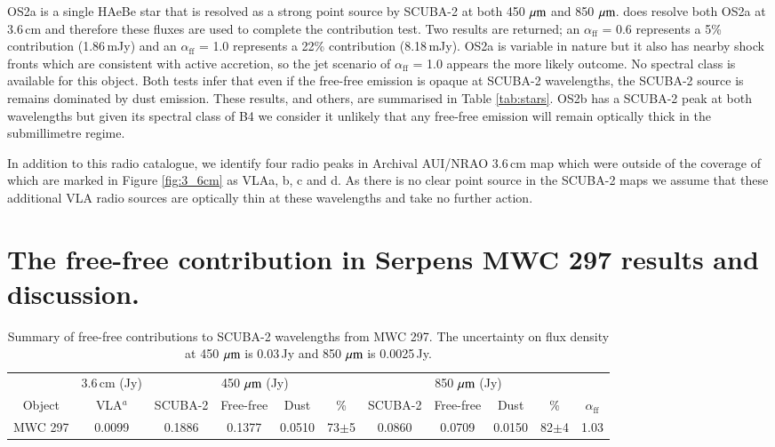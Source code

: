 OS2a is a single HAeBe star that is resolved as a strong point source by SCUBA-2 at both 450\,$\,\mu\rm{m}$ and 850\,$\,\mu\rm{m}$. \cite{Rodriguez:2010bs} does resolve both OS2a at 3.6\,cm and therefore these fluxes are used to complete the contribution test. Two results are returned; an $\alpha_{\mathrm{ff}}$ = 0.6 represents a 5\% contribution (1.86\,mJy) and an $\alpha_{\mathrm{ff}}$ = 1.0 represents a 22\% contribution (8.18\,mJy). 
OS2a is variable in nature but it also has nearby shock fronts which are consistent with active accretion, so the jet scenario of $\alpha_{\mathrm{ff}}$ = 1.0 appears the more likely outcome. No spectral class is available for this object. 
Both tests infer that even if the free-free emission is opaque at SCUBA-2 wavelengths, the SCUBA-2 source is remains dominated by dust emission. These results, and others, are summarised in Table \ref{tab:stars}.
OS2b has a SCUBA-2 peak at both wavelengths but given its spectral class of B4 we consider it unlikely that any free-free emission will remain optically thick in the submillimetre regime. 

In addition to this radio catalogue, we identify four radio peaks in Archival AUI/NRAO 3.6\,cm map which were outside 
of the coverage of \cite{Rodriguez:2010bs} which are marked in Figure \ref{fig:3_6cm} as VLAa, b, c and d. As there is no clear point source in the SCUBA-2 maps we assume that these additional VLA radio sources are optically thin at these wavelengths and take no further action.






\section{The free-free contribution in Serpens MWC 297 results and discussion.}

\begin{table}%
\caption{Summary of free-free contributions to SCUBA-2 wavelengths from MWC 297. The uncertainty on flux density at 450\,$\,\mu\rm{m}$ is 0.03\,Jy and 850\,$\,\mu\rm{m}$ is 0.0025\,Jy. }
\begin{tabular}{@{}|c|ccccccccc|c|}
       & 3.6\,cm (Jy)	& \multicolumn{4}{c}{450\,$\,\mu\rm{m}$ (Jy)} & \multicolumn{4}{c}{850\,$\,\mu\rm{m}$ (Jy)} \\
Object &	VLA$^{a}$	& SCUBA-2       & Free-free      & Dust      & \%      & SCUBA-2      & Free-free      & Dust       & \% 	& $\alpha_{\mathrm{ff}}$     \\
\hline
\hline
MWC 297   &	0.0099	& 0.1886             &  0.1377         &  0.0510 & 73$\pm$5 & 0.0860	&	0.0709	&	0.0150	&	82$\pm$4	&	1.03      \\

\hline
\end{tabular}\\
\raggedright

\label{tab:MWC297}
\end{table}

